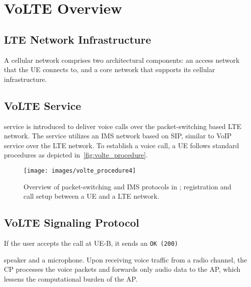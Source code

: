 \chapter{VoLTE Overview}
\label{sec:back}

\section{LTE Network Infrastructure}
\label{sec:cellular}

A cellular network comprises two architectural components: an access
network that the UE connects to, and a core network that supports its
cellular infrastructure.
 

\section{VoLTE Service}
\label{sec:volte_network}

\vt service is introduced to deliver voice calls
over the packet-switching based LTE network.
The service utilizes an IMS network based on SIP,
similar to VoIP service over the LTE network.
To establish a voice call, a UE
follows standard procedures as depicted in~\autoref{fig:volte_procedure}.

\begin{figure}[h]
  \centering
  \texttt{[image: images/volte\_procedure4]}
  \caption{Overview of packet-switching and IMS protocols in \vt; registration and call setup
    between a UE and a LTE network.}
  \label{fig:volte_procedure}
\end{figure}


\section{VoLTE Signaling Protocol}
\label{sec:signal_protocol}


If the user accepts the call at UE-B, it sends an {\tt OK (200)}


speaker and a microphone. Upon receiving voice traffic from a radio
channel, the CP processes the voice packets and forwards only audio data to
the AP, which lessens the computational burden of the AP. 



